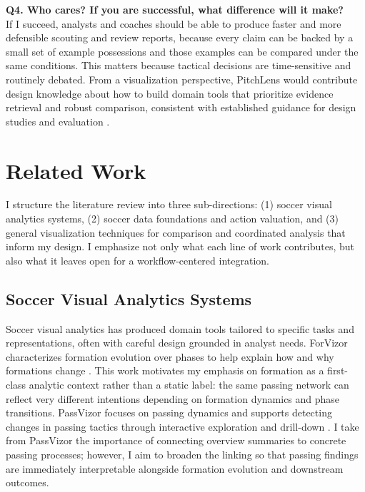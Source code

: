\documentclass{vgtc}                          %
\begin{document}
\noindent\textbf{Q4. Who cares? If you are successful, what difference will it make?}\\
If I succeed, analysts and coaches should be able to produce faster and more defensible scouting and review reports, because every claim can be backed by a small set of example possessions and those examples can be compared under the same conditions. This matters because tactical decisions are time-sensitive and routinely debated. From a visualization perspective, PitchLens would contribute design knowledge about how to build domain tools that prioritize evidence retrieval and robust comparison, consistent with established guidance for design studies and evaluation \cite{Sedlmair2012DesignStudy,Munzner2009NestedModel,McKenna2014DesignActivity,Lam2012Evaluation}.

\section{Related Work}
I structure the literature review into three sub-directions: (1) soccer
visual analytics systems, (2) soccer data foundations and action valuation,
and (3) general visualization techniques for comparison and coordinated analysis
that inform my design. I emphasize not only what each line of work contributes,
but also what it leaves open for a workflow-centered integration.

\subsection{Soccer Visual Analytics Systems}
Soccer visual analytics has produced domain tools tailored to specific tasks and
representations, often with careful design grounded in analyst needs. ForVizor
characterizes formation evolution over phases to help explain how and why
formations change \cite{Wu2019ForVizor}. This work motivates my emphasis on
formation as a first-class analytic context rather than a static label: the same
passing network can reflect very different intentions depending on formation
dynamics and phase transitions. PassVizor focuses on passing dynamics and
supports detecting changes in passing tactics through interactive exploration and
drill-down \cite{Xie2021PassVizor}. I take from PassVizor the importance of
connecting overview summaries to concrete passing processes; however, I aim to
broaden the linking so that passing findings are immediately interpretable
alongside formation evolution and downstream outcomes.
\end{document}
